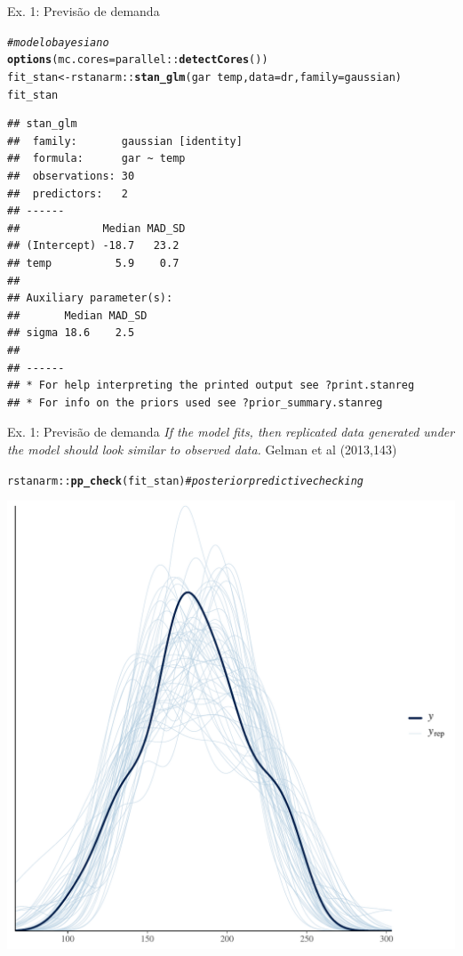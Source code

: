 \documentclass{beamer}\usepackage[]{graphicx}\usepackage[]{xcolor}
\makeatletter
\newcommand{\hlcom}[1]{\textcolor[rgb]{0.678,0.584,0.686}{\textit{#1}}}%
\newcommand{\hlopt}[1]{\textcolor[rgb]{0,0,0}{#1}}%
\newcommand{\hldef}[1]{\textcolor[rgb]{0.345,0.345,0.345}{#1}}%
\newcommand{\hlkwb}[1]{\textcolor[rgb]{0.69,0.353,0.396}{#1}}%
\newcommand{\hlkwc}[1]{\textcolor[rgb]{0.333,0.667,0.333}{#1}}%
\newcommand{\hlkwd}[1]{\textcolor[rgb]{0.737,0.353,0.396}{\textbf{#1}}}%
\newenvironment{kframe}{%
 \def\at@end@of@kframe{}%
 \ifinner\ifhmode%
  \def\at@end@of@kframe{\end{minipage}}%
  \begin{minipage}{\columnwidth}%
 \fi\fi%
 \def\FrameCommand##1{\hskip\@totalleftmargin \hskip-\fboxsep
 \colorbox{shadecolor}{##1}\hskip-\fboxsep
     \hskip-\linewidth \hskip-\@totalleftmargin \hskip\columnwidth}%
 \MakeFramed {\advance\hsize-\width
   \@totalleftmargin\z@ \linewidth\hsize
   \@setminipage}}%
 {\par\unskip\endMakeFramed%
 \at@end@of@kframe}
\newenvironment{knitrout}{}{} %
\makeatother
\begin{document}
\begin{frame}[fragile]{Ex. 1: Previsão de demanda}
\fontsize{8pt}{8pt}\selectfont
\begin{knitrout}
\color{fgcolor}\begin{kframe}
\begin{alltt}
\hlcom{# modelo bayesiano}
\hlkwd{options}\hldef{(}\hlkwc{mc.cores} \hldef{= parallel}\hlopt{::}\hlkwd{detectCores}\hldef{())}
\hldef{fit_stan} \hlkwb{<-} \hldef{rstanarm}\hlopt{::}\hlkwd{stan_glm}\hldef{(gar} \hlopt{~} \hldef{temp,} \hlkwc{data} \hldef{= dr,} \hlkwc{family} \hldef{= gaussian)}
\hldef{fit_stan}
\end{alltt}
\begin{verbatim}
## stan_glm
##  family:       gaussian [identity]
##  formula:      gar ~ temp
##  observations: 30
##  predictors:   2
## ------
##             Median MAD_SD
## (Intercept) -18.7   23.2 
## temp          5.9    0.7 
## 
## Auxiliary parameter(s):
##       Median MAD_SD
## sigma 18.6    2.5  
## 
## ------
## * For help interpreting the printed output see ?print.stanreg
## * For info on the priors used see ?prior_summary.stanreg
\end{verbatim}
\end{kframe}
\end{knitrout}
\end{frame}


\begin{frame}[fragile]{Ex. 1: Previsão de demanda}
\textit{If the model fits, then replicated data generated under the model should look similar to observed data.} Gelman et al (2013,143)
\fontsize{8pt}{8pt}\selectfont
\begin{knitrout}
\color{fgcolor}\begin{kframe}
\begin{alltt}
\hldef{rstanarm}\hlopt{::}\hlkwd{pp_check}\hldef{(fit_stan)} \hlcom{# posterior predictive checking}
\end{alltt}
\end{kframe}

{\centering \includegraphics[width=.5\linewidth]{figure/ppc-1} 

}


\end{knitrout}
\end{frame}
\end{document}
